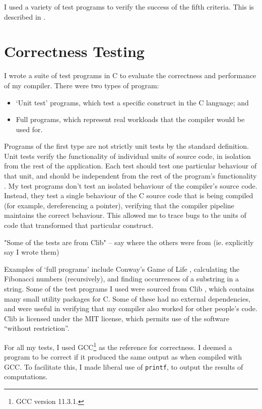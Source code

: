 \documentclass[00-main.tex]{subfiles}
\begin{document}
I used a variety of test programs to verify the success of the fifth criteria. This is described in .


\section{Correctness Testing} \label{sec:eval:testing}

I wrote a suite of test programs in C to evaluate the correctness and performance of my compiler.
There were two types of program:
\begin{itemize}
\item `Unit test' programs, which test a specific construct in the C language; and
\item Full programs, which represent real workloads that the compiler would be used for.
\end{itemize}

Programs of the first type are not strictly unit tests by the standard definition.
Unit tests verify the functionality of individual units of source code, in isolation from the rest of the application.
Each test should test one particular behaviour of that unit, and should be independent from the rest of the program's functionality \cite{unit-testing}.
My test programs don't test an isolated behaviour of the compiler's source code.
Instead, they test a single behaviour of the C source code that is being compiled (for example, dereferencing a pointer), verifying that the compiler pipeline maintains the correct behaviour.
This allowed me to trace bugs to the units of code that transformed that particular construct.

\begin{Comment}
"Some of the tests are from Clib" -- say where the others were from (ie. explicitly say I wrote them)
\end{Comment}

Examples of `full programs' include Conway's Game of Life \cite{conways-game-of-life}, calculating the Fibonacci numbers (recursively), and finding occurrences of a substring in a string.
Some of the test programs I used were sourced from Clib \cite{clib}, which contains many small utility packages for C. Some of these had no external dependencies, and were useful in verifying that my compiler also worked for other people's code. Clib is licensed under the MIT license, which permits use of the software ``without restriction''.

For all my tests, I used GCC\footnote{GCC version 11.3.1.} as the reference for correctness.
I deemed a program to be correct if it produced the same output as when compiled with GCC.
To facilitate this, I made liberal use of \texttt{printf}, to output the results of computations.
\end{document}
